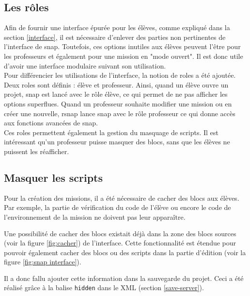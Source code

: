\subsection{Les rôles}
\label{role}
Afin de fournir une interface épurée pour les élèves, comme expliqué dans la section \ref{interface}, il est nécessaire d'enlever des parties non pertinentes de l'interface de \gls{snap}. Toutefois, ces options inutiles aux élèves peuvent l'être pour les professeurs et également pour une \gls{mission} en "mode ouvert". Il est donc utile d'avoir une interface modulaire suivant son utilisation. \\

Pour différencier les utilisations de l'interface, la notion de \glspl{role} a été ajoutée. Deux \glspl{role} sont définis : élève et professeur. Ainsi, quand un élève ouvre un projet, \gls{snap} est lancé avec le rôle élève, ce qui permet de ne pas afficher les options superflues. Quand un professeur souhaite modifier une \gls{mission} ou en créer une nouvelle, \gls{rsnap} lance \gls{snap} avec le rôle professeur ce qui donne accès aux fonctions avancées de \gls{snap}.\\

Ces \glspl{role} permettent également la gestion du masquage de \glspl{script}. Il est intéressant qu'un professeur puisse masquer des \glspl{bloc}, sans que les élèves ne puissent les réafficher.

\subsection{Masquer les scripts}
Pour la création des \glspl{mission}, il a été nécessaire de cacher des \glspl{bloc} aux élèves. Par exemple, la partie de vérification du code de l'élève ou encore le code de l'environnement de la \gls{mission} ne doivent pas leur apparaître.

Une possibilité de cacher des \glspl{bloc} existait déjà dans la zone des \glspl{bloc} sources (voir la figure \ref{fig:cacher}) de l'interface. Cette fonctionnalité est étendue pour pouvoir également cacher des \glspl{bloc} ou des \glspl{script} dans la partie d'édition (voir la figure \ref{fig:snap interface}).

Il a donc fallu ajouter cette information dans la sauvegarde du projet. Ceci a été réalisé grâce à la balise \texttt{hidden} dans le XML (section \ref{save-server}).\\


